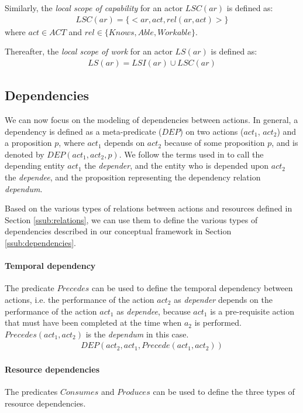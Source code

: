 Similarly, the \emph{local scope of capability} for an actor $LSC(ar)$ is defined as:
\begin{align*} 
	LSC(ar) = \{<ar, act, rel(ar, act)>\}
\end{align*}
where $act\in ACT$ and $rel\in \{Knows, Able, Workable\}$.

Thereafter, the \emph{local scope of work} for an actor $LS(ar)$ is defined as:
\begin{align*} 
	LS(ar) = LSI(ar) \cup LSC(ar)
\end{align*}
\subsection{Dependencies} %
\label{sub:dependencies}
We can now focus on the modeling of dependencies between actions. In general, a dependency is defined as a meta-predicate ($DEP$) on two actions ($act_1$, $act_2$) and a proposition $p$, where $act_1$ depends on $act_2$ because of some proposition $p$, and is denoted by $DEP(act_1, act_2, p)$. We follow the terms used in \cite{yu1993actor} to call the depending entity $act_1$ the \emph{depender}, and the entity who is depended upon $act_2$ the \emph{dependee}, and the proposition representing the dependency relation \emph{dependum}.

Based on the various types of relations between actions and resources defined in Section \ref{ssub:relations}, we can use them to define the various types of dependencies described in our conceptual framework in Section \ref{ssub:dependencies}. 

\paragraph*{Temporal dependency} %
\label{par:temporal_dependencies_}
The predicate $Precedes$ can be used to define the temporal dependency between actions, i.e. the performance of the action $act_2$ as \emph{depender} depends on the performance of the action $act_1$ as \emph{dependee}, because $act_1$ is a pre-requisite action that must have been completed at the time when $a_2$ is performed. $Precedes(act_1, act_2)$ is the \emph{dependum} in this case.
\begin{align*} 
	 DEP(act_2, act_1, Precede(act_1, act_2))
\end{align*}

\paragraph*{Resource dependencies} %
\label{par:resource_dependencies}
The predicates $Consumes$ and $Produces$ can be used to define the three types of resource dependencies. 

